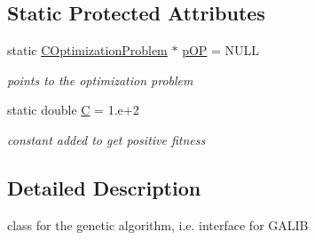 \subsection*{Static Protected Attributes}
\begin{DoxyCompactItemize}
\item 
static \hyperlink{class_go_s_u_m_1_1_c_optimization_problem}{C\-Optimization\-Problem} $\ast$ \hyperlink{class_go_s_u_m_1_1_c_g_a_model_optimization_aaa06d9ea4224cfce63846e80ef228c6b}{p\-O\-P} = N\-U\-L\-L
\begin{DoxyCompactList}\small\item\em points to the optimization problem \end{DoxyCompactList}\item 
static double \hyperlink{class_go_s_u_m_1_1_c_g_a_model_optimization_ab1be1deca11e58b9e80a6784b069aa43}{C} = 1.e+2
\begin{DoxyCompactList}\small\item\em constant added to get positive fitness \end{DoxyCompactList}\end{DoxyCompactItemize}


\subsection{Detailed Description}
class for the genetic algorithm, i.\-e. interface for G\-A\-L\-I\-B 

